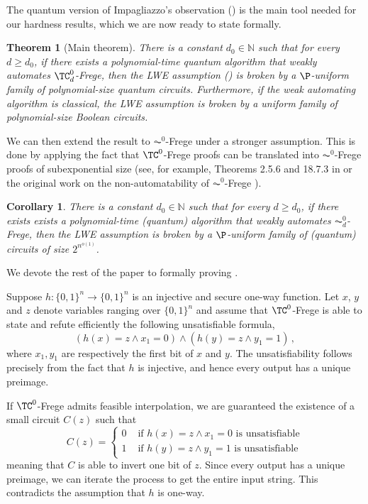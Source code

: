 \documentclass[11pt]{article}
\theoremstyle{definition}
\theoremstyle{plain}
\newtheorem{theorem}[definition]{Theorem}
\newtheorem{corollary}[definition]{Corollary}
\theoremstyle{remark}
\newcommand{\bN}{\mathbb{N}}
\begin{document}
The quantum version of Impagliazzo's observation () is the main tool needed for our hardness results, which we are now ready to state formally.

\begin{theorem}[Main theorem]
\label{thm:main}
    There is a constant $d_0 \in \bN$ such that for every $d \geq d_0$, if there exists a polynomial-time quantum algorithm that weakly automates $\TC^0_d$-Frege, then the LWE assumption () is broken by a $\P$-uniform family of polynomial-size quantum circuits. Furthermore, if the weak automating algorithm is classical, the LWE assumption is broken by a uniform family of polynomial-size Boolean circuits.
\end{theorem}

We can then extend the result to $\AC^0$-Frege under a stronger assumption. This is done by applying the fact that $\TC^0$-Frege proofs can be translated into $\AC^0$-Frege proofs of subexponential size (see, for example, Theorems 2.5.6 and 18.7.3 in \cite{krajicekBOOK} or the original work on the non-automatability of $\AC^0$-Frege \cite{BDGMP04}).

\begin{corollary}
\label{cor:main-AC0}
    There is a constant $d_0 \in \bN$ such that for every $d \geq d_0$, if there exists exists a polynomial-time (quantum) algorithm that weakly automates $\AC^0_d$-Frege, then the LWE assumption is broken by a $\P$-uniform family of (quantum) circuits of size $2^{n^{o(1)}}$.
\end{corollary}

We devote the rest of the paper to formally proving .

Suppose $h : \{0,1\}^n \to \{0,1\}^n$ is an injective and secure one-way function. Let $x$, $y$ and $z$ denote variables ranging over $\{0,1\}^n$ and assume that $\TC^0$-Frege is able to state and refute efficiently the following unsatisfiable formula,
\[ (h(x) = z \land x_1 = 0) \land (h(y) = z \land y_1 = 1)\,, \]
where $x_1, y_1$ are respectively the first bit of $x$ and $y$. The unsatisfiability follows precisely from the fact that $h$ is injective, and hence every output has a unique preimage.

If $\TC^0$-Frege admits feasible interpolation, we are guaranteed the existence of a small circuit $C(z)$ such that
\begin{equation*}
    C(z) = \begin{cases}
        0 &\text{ if } h(x) = z \land x_1 = 0 \text{ is unsatisfiable} \\
        1 &\text{ if } h(y) = z \land y_1 = 1 \text{ is unsatisfiable}
    \end{cases}
\end{equation*}
meaning that $C$ is able to invert one bit of $z$. Since every output has a unique preimage, we can iterate the process to get the entire input string. This contradicts the assumption that $h$ is one-way.
\end{document}
